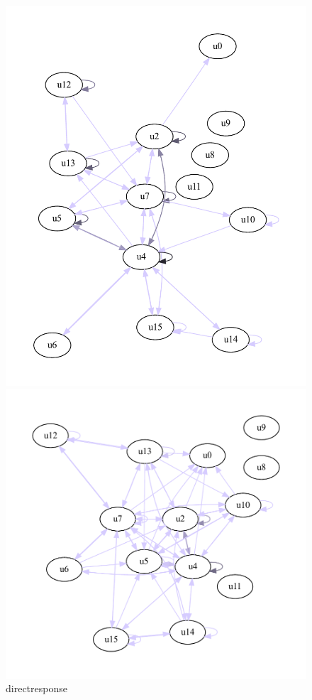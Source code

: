 \documentclass[a4paper]{scrartcl}
\begin{document}
\begin{figure}
  \centering
  \parbox[b]{.33\textwidth}{\vspace{-5ex}
  \includegraphics[width=\linewidth]{gv_drg}\vspace{-5ex}
  \caption{directresponse}
  \label{fig:gv_drg}}\hfill
  \parbox[b]{.33\textwidth}{
  \includegraphics[width=\linewidth]{gv_grg}\vspace{-3ex}
}
\end{figure}
\end{document}
